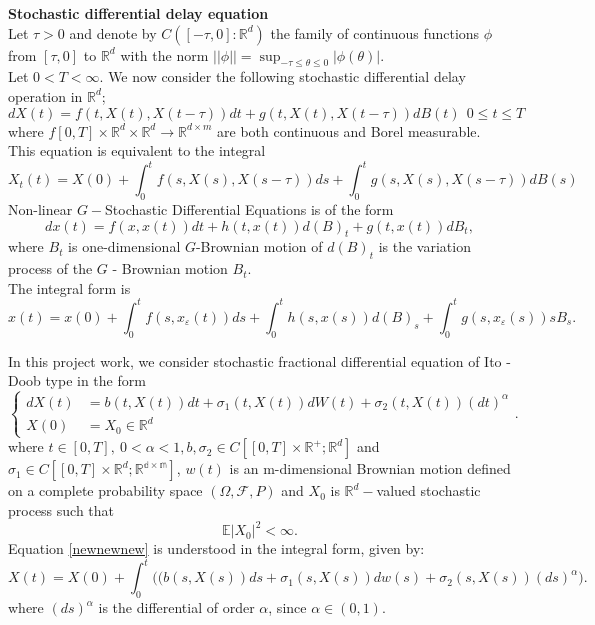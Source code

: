 \documentclass[a4 paper, 12pt]{report}
\theoremstyle{plain}
\begin{document}
\textbf{Stochastic differential delay equation}\\
Let $\tau>0$ and denote by $C([-\tau,0]:\mathbb{R}^d)$ the family of continuous functions $\phi$ from $[\tau,0]$ to $\mathbb{R}^d$ with the norm $||\phi|| = \sup_{-\tau\leq \theta\leq 0}|\phi(\theta)|$.\\
Let $0<T<\infty$. We now consider the following stochastic differential delay operation in $\mathbb{R}^d$;
\begin{equation}\label{new1.13}
dX(t) = f(t,X(t), X(t-\tau))dt+g(t,X(t),X(t-\tau))dB(t)~~0\leq t\leq T
\end{equation}
where $f[0,T]\times\mathbb{R}^d\times\mathbb{R}^d\rightarrow \mathbb{R}^{d\times m}$ are both continuous and Borel measurable.\\
This equation is equivalent to the integral
\begin{equation}\label{new1.14}
    X_t(t) = X(0)+\int_0^tf(s,X(s),X(s-\tau))ds+\int_0^tg(s,X(s), X(s-\tau))dB(s)
\end{equation}
Non-linear $G-$Stochastic Differential Equations is of the form
\begin{equation}\label{new1.15}
dx(t) = f(x,x(t))dt+h(t,x(t))d(B)_t+g(t,x(t))dB_t,
\end{equation}
where $B_t$ is one-dimensional $G$-Brownian motion of $d(B)_t$ is the variation process of the $G$ - Brownian motion $B_t$.\\
The integral form is
\begin{equation}
    x(t)=x(0)+\int_0^tf(s,x_\varepsilon(t))ds+\int_0^th(s,x(s))d(B)_s+\int_0^t g(s,x_\varepsilon(s))sB_s.
\end{equation}
\par In this project work, we consider stochastic fractional differential equation of Ito - Doob type in the form
\begin{equation}\label{newnewnew}
\left\{
\begin{split}
dX(t) & = b(t,X(t))dt+\sigma_1(t,X(t))dW(t)+\sigma_2(t,X(t))(dt)^\alpha\\
X(0)& = X_0\in\mathbb{R}^d
\end{split}
\right. .
\end{equation}
where $t\in[0,T],~0<\alpha<1,b,\sigma_2\in C[[0,T]\times\mathbb{R}^+;\mathbb{R}^d]$ and $\sigma_1\in C[[0,T]\times \mathbb{R}^d;\mathbb{R^{d\times m}}]$, $w(t)$ is an m-dimensional Brownian motion defined on a complete probability space $(\Omega,\mathcal{F},P)$ and $X_0$ is $\mathbb{R}^d-$valued stochastic process such that
\begin{equation}
\mathbb{E}|X_0|^2<\infty.
\end{equation}
Equation \eqref{newnewnew} is understood in the integral form, given by: %
$$
X(t) = X(0)+\int_0^t\bigg((b(s,X(s))ds+\sigma_1(s,X(s))dw(s)+\sigma_2(s,X(s))(ds)^\alpha\bigg).
$$
where $(ds)^\alpha$ is the differential of order $\alpha$, since $\alpha\in(0,1)$.
\end{document}
